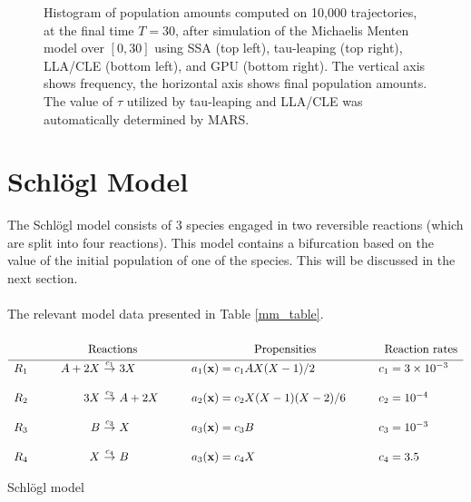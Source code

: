 \documentclass[ugrad,lot,lof,openright,11pt,oneside,onehalfspace]{RUthesis}
\begin{document}
\begin{figure}[H]
{			}
		\captionsetup{width=0.8\textwidth}
		\caption[Histogram of end populations of the Michaelis Menten model from 10,000 trajectories]{Histogram of population amounts computed on 10,000 trajectories, at the final time $T=30$, after simulation of the Michaelis Menten model over $[0,30]$ using SSA (top left), tau-leaping (top right), LLA/CLE (bottom left), and GPU (bottom right). The vertical axis shows frequency, the horizontal axis shows final population amounts. The value of $\tau$ utilized by tau-leaping and LLA/CLE was automatically determined by MARS.}
		\label{mm_hist_figure}
		\end{figure}

	\section{Schl\"{o}gl Model}

		The Schl\"{o}gl model \cite{schlogl} consists of 3 species engaged in two reversible reactions (which are split into four reactions). This model contains a bifurcation based on the value of the initial population of one of the species. This will be discussed in the next section.\\
		\\
		The relevant model data presented in Table \ref{mm_table}.

		\begin{table}[H]
		\[
		\begin{array}{l@{\hspace*{10mm}}r@{\ }c@{\ }l@{\hspace*{10mm}}l@{\hspace*{10mm}}l}
		\multicolumn{4}{c}{\text{{\huge\phantom{$I_{I_I}$}}Reactions}} & \multicolumn{1}{c}{\text{Propensities}} & \multicolumn{1}{c}{\text{Reaction rates}}\\
		\hline
		R_1 	& A+2X & \stackrel{c_1}{\rightarrow} & 3X 	& a_1(\mathbf{x})=c_1AX(X-1)/2 	 & c_1 = 3 \times 10^{-3}
		\\\\
		R_2 	& 3X & \stackrel{c_2}{\rightarrow} & A + 2X  	& a_2(\mathbf{x})=c_2X(X-1)(X-2)/6		& c_2 = 10^{-4}
		\\\\
		R_3 	& B & \stackrel{c_3}{\rightarrow} & X 		& a_3(\mathbf{x}) = c_3 B 					& c_3 = 10^{-3}
		\\\\
		R_4 	& X & \stackrel{c_4}{\rightarrow} & B 		& a_3(\mathbf{x}) = c_4 X 					& c_4 = 3.5
		\end{array}
		\]
		\captionsetup{width=0.8\textwidth}
		\caption{Schl\"{o}gl model}
		\label{schlogl_table}
		\end{table}
\end{document}

